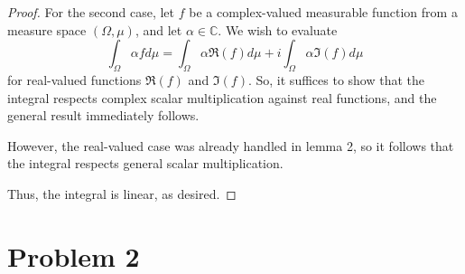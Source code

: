 \documentclass[fontsize=11pt]{scrartcl} %
\numberwithin{equation}{section} %
\numberwithin{figure}{section} %
\numberwithin{table}{section} %
\newcommand{\C}{\mathbb{C}}
\theoremstyle{definition}
\begin{document}
\begin{proof}
For the second case, let $f$ be a complex-valued measurable function from a measure space
$(\Omega,\mu)$, and let $\alpha\in\C$. We wish to evaluate
\[
\int_{\Omega}\alpha fd\mu = \int_{\Omega}\alpha\Re(f)d\mu + i\int_{\Omega}\alpha\Im(f)d\mu
\]
for real-valued functions $\Re(f)$ and $\Im(f)$.
So, it suffices to show that the integral respects complex scalar multiplication against real
functions, and the general result immediately follows.

However, the real-valued case was already handled in lemma 2, so it follows that the integral
respects general scalar multiplication.

Thus, the integral is linear, as desired.
\end{proof}

\newpage
\section*{Problem 2}
\end{document}
